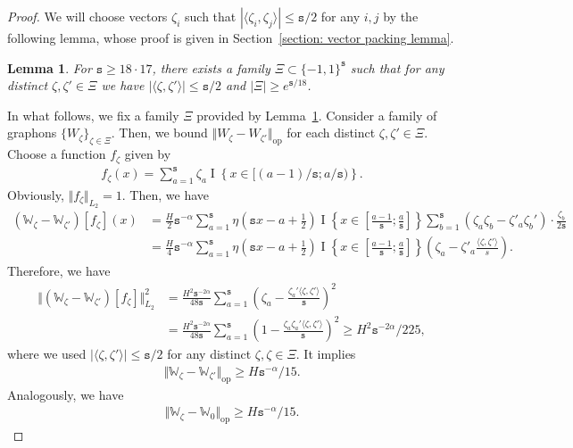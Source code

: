\documentclass[11pt]{article}
\newcommand{\op}{\mathrm{op}}
\newcommand{\bbW}{\mathbb{W}}
\newcommand{\indicator}[1]{{\operatorname{I} \left \{ #1\right \}}}
\newcommand{\<}{\langle}
\renewcommand{\>}{\rangle}
\newcommand{\ts}{\mathtt{s}}
\theoremstyle{plain}
\newtheorem{lemma}{Lemma}
\theoremstyle{definition}
\theoremstyle{remark}
\begin{document}
{\begin{proof}
We will choose vectors $\zeta_i$ such that $|\langle \zeta_i, \zeta_j \rangle| \le \ts/2$ for any $i, j$ by the following lemma, whose proof is given in Section~\ref{section: vector packing lemma}.

\begin{lemma}
\label{lemma: almost orthogonal vectors}
For $\ts \ge 18 \cdot 17$, there exists a family $\Xi \subset \{-1, 1\}^{\ts}$ such that for any distinct $\zeta, \zeta' \in \Xi$ we have $|\langle \zeta, \zeta' \rangle | \le \ts/2$ and $|\Xi| \ge e^{\ts/18}$.
\end{lemma}


In what follows, we fix a family $\Xi$ provided by Lemma~\ref{lemma: almost orthogonal vectors}. Consider a family of graphons $\{W_{\zeta} \}_{\zeta \in \Xi}$. Then, we bound $\Vert W_{\zeta} - W_{\zeta'} \Vert_{\op}$ for each distinct $\zeta, \zeta' \in \Xi$. Choose a function $f_{\zeta}$ given by
\begin{align*}
    f_{\zeta}(x) = \sum_{a = 1}^{\ts} \zeta_a \indicator{x \in [(a - 1)/\ts; a/\ts)}.
\end{align*}
Obviously, $\Vert f_{\zeta} \Vert_{L_2} = 1$. Then, we have
\begin{align*}
     (\bbW_{\zeta} - \bbW_{\zeta'}) [f_{\zeta}](x) & =  \frac{H}{2}\ts^{-\alpha} \sum_{a = 1}^\ts \eta(\ts x - a + \frac{1}{2} ) \indicator{x \in \left [\frac{a - 1}{\ts}; \frac{a}{\ts} \right ]} \sum_{b = 1}^\ts (\zeta_a \zeta_b - \zeta'_a \zeta_b') \cdot \frac{\zeta_b}{2 \ts} \\
     & = \frac{H}{4}\ts^{-\alpha} \sum_{a = 1}^\ts \eta(\ts x - a + \frac{1}{2} ) \indicator{x \in \left [\frac{a - 1}{\ts}; \frac{a}{\ts} \right ]}  \left (\zeta_a  - \zeta'_a \frac{\langle \zeta,  \zeta' \rangle}{s} \right ).
\end{align*}
Therefore, we have
\begin{align*}
    \Vert (\bbW_{\zeta} - \bbW_{\zeta'}) [f_{\zeta}] \Vert_{L_2}^2 & = \frac{H^2 \ts^{-2 \alpha}}{48 \ts} \sum_{a = 1}^\ts \left (\zeta_a - \frac{\zeta_a' \langle \zeta, \zeta' \rangle }{\ts} \right )^2 \\ 
    & = \frac{H^2 \ts^{-2 \alpha}}{48 \ts} \sum_{a = 1}^\ts \left (1 - \frac{\zeta_a \zeta_a' \langle \zeta, \zeta' \rangle }{\ts} \right )^2 \ge H^2 \ts^{-2\alpha} / 225,
\end{align*}
where we used $|\langle \zeta, \zeta' \rangle| \le \ts/2$ for any distinct $\zeta, \zeta \in \Xi$.
It implies
\begin{align}
    \Vert \bbW_{\zeta} - \bbW_{\zeta'} \Vert_{\op} \ge H \ts^{-\alpha} / 15. \label{eq: packing in operator norm}
\end{align}
Analogously, we have
\begin{align}
\Vert \bbW_{\zeta} - \bbW_{0} \Vert_{\op} \ge H \ts^{-\alpha} / 15. \label{eq: boundness of packing from 0}
\end{align}


\end{proof}}
\end{document}

